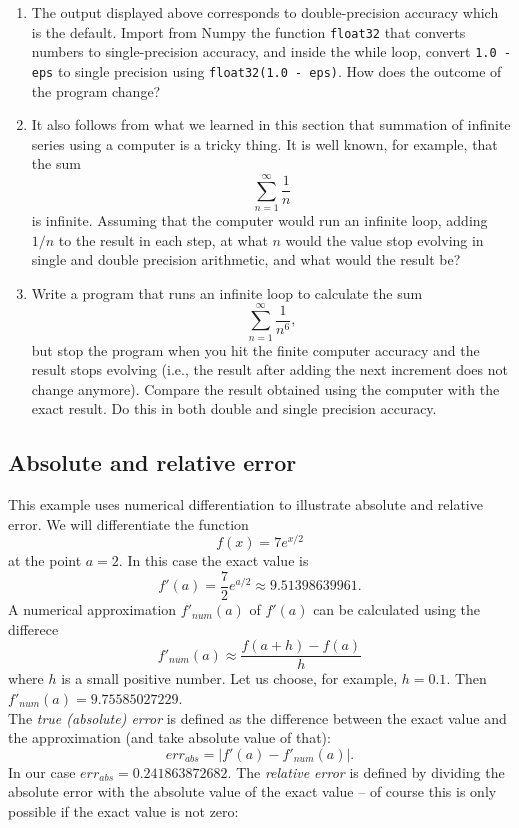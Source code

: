 \documentclass[article,A4,12pt]{llncs}
\begin{document}
\begin{enumerate}
\item The output displayed above corresponds to double-precision 
accuracy which is the default. Import from Numpy the function {\tt float32}
that converts numbers to single-precision accuracy, and inside the while loop,
convert {\tt 1.0 - eps} to single precision using {\tt float32(1.0 - eps)}.
How does the outcome of the program change?
\item It also follows from what we learned in this section that summation 
of infinite series using a computer is a tricky thing. It is well known,
for example, that the sum
$$
\sum_{n=1}^{\infty} \frac{1}{n}
$$
is infinite. Assuming that the computer would run an infinite loop, adding 
$1/n$ to the result in each step, at what $n$ would the value stop evolving 
in single and double precision arithmetic, and what would the result be?
\item Write a program that runs an infinite loop to calculate the sum
$$
\sum_{n=1}^{\infty} \frac{1}{n^6},
$$
but stop the program when you hit the finite computer accuracy and the result 
stops evolving (i.e., the result after adding the next increment does not 
change anymore). Compare the result 
obtained using the computer with the exact result. Do this in both double 
and single precision accuracy.
\end{enumerate}

\subsection{Absolute and relative error}

This example uses numerical differentiation to illustrate
absolute and relative error. We will differentiate the 
function 
$$
f(x) = 7e^{x/2}
$$
at the point $a = 2$. In this case the exact value is 
$$
f'(a) = \frac{7}{2}e^{a/2} \approx 9.51398639961.
$$
A numerical approximation $f'_{num}(a)$ of $f'(a)$ can be calculated using the differece
$$
f'_{num}(a) \approx \frac{f(a+h) - f(a)}{h}
$$
where $h$ is a small positive number. Let us choose, for example,
$h = 0.1$. Then $f'_{num}(a) = 9.75585027229$.\\

\noindent
The {\em true (absolute) error} is defined as the difference between the exact value and the approximation
(and take absolute value of that):
$$
err_{abs} = |f'(a) - f'_{num}(a)|.
$$
In our case $err_{abs} = 0.241863872682$. The {\em relative error} is defined by dividing 
the absolute error with the absolute value of the exact value -- of course this is only 
possible if the exact value is not zero:
\end{document}
